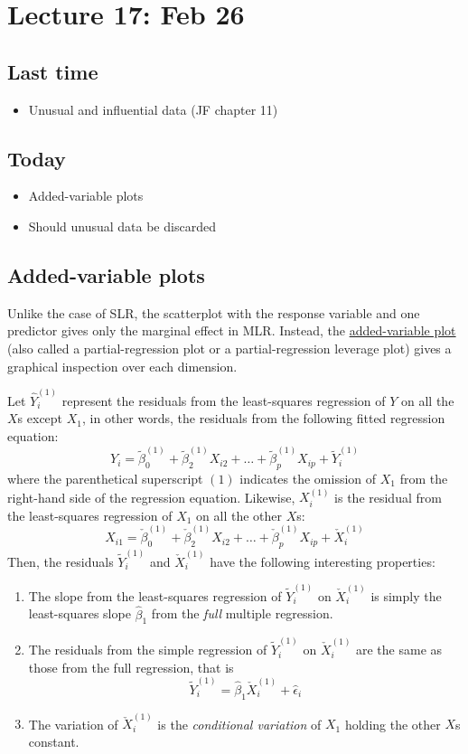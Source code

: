 \setcounter{section}{16}


\section{Lecture 17: Feb 26}


\subsection*{Last time}
\begin{itemize}
 \item Unusual and influential data (JF chapter 11)
\end{itemize}


\subsection*{Today}
\begin{itemize}
 \item Added-variable plots
 \item Should unusual data be discarded
\end{itemize}



\subsection*{Added-variable plots}
Unlike the case of SLR, the scatterplot with the response variable and one predictor gives only the marginal effect in MLR.
Instead, the \underline{added-variable plot} (also called a partial-regression plot or a partial-regression leverage plot) gives a graphical inspection over each dimension.

Let $\hat{Y}_i^{(1)}$ represent the residuals from the least-squares regression of $Y$ on all the $X$s except $X_1$, in other words, the residuals from the following fitted regression equation:
$$
Y_i = \tilde{\beta}_0 ^{(1)} +  \tilde{\beta}_2^{(1)} X_{i2} + \dots +  \tilde{\beta}_p ^{(1)} X_{ip} + \tilde{Y}_i^{(1)}
$$  
where the parenthetical superscript $(1)$ indicates the omission of $X_1$ from the right-hand side of the regression equation.
Likewise, $X_i^{(1)}$ is the residual from the least-squares regression of $X_1$ on all the other $X$s:
$$
X_{i1} = \check{\beta}_0^{(1)} +  \check{\beta}_2^{(1)} X_{i2} + \dots +  \check{\beta}_p^{(1)} X_{ip} + \check{X}_i^{(1)}
$$
Then, the residuals $ \tilde{Y}_i^{(1)}$ and $\check{X}_i^{(1)}$ have the following interesting properties:
\begin{enumerate}
  \item The slope from the least-squares regression of  $ \tilde{Y}_i^{(1)}$ on $\check{X}_i^{(1)}$ is simply the least-squares slope $\hat{\beta}_1$ from the {\it full} multiple regression.
  \item The residuals from the simple regression of $ \tilde{Y}_i^{(1)}$ on $\check{X}_i^{(1)}$ are the same as those from the full regression, that is
  $$
 \tilde{Y}_i^{(1)} = \hat{\beta}_1 \check{X}_i^{(1)} + \hat{\epsilon}_i
  $$
  \item The variation of $\check{X}_i^{(1)}$ is the {\it conditional variation} of $X_1$ holding the other $X$s constant.
\end{enumerate}

